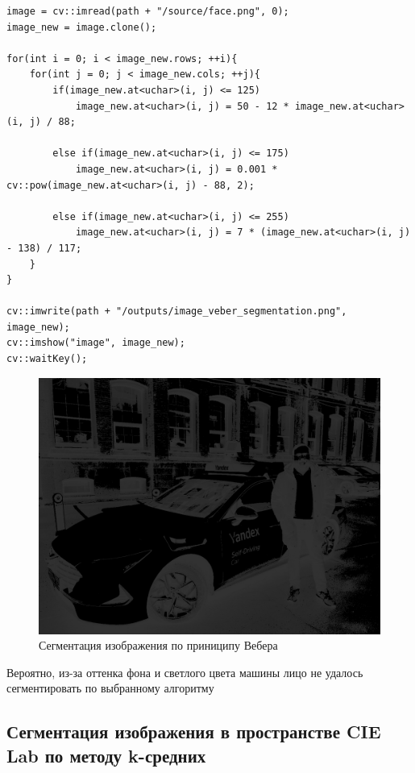 \begin{lstlisting}[style=cpp_white, caption={Исходный код для сегментации по принципу Вебера}]
image = cv::imread(path + "/source/face.png", 0);
image_new = image.clone();

for(int i = 0; i < image_new.rows; ++i){
    for(int j = 0; j < image_new.cols; ++j){
        if(image_new.at<uchar>(i, j) <= 125)
            image_new.at<uchar>(i, j) = 50 - 12 * image_new.at<uchar>(i, j) / 88;   
        
        else if(image_new.at<uchar>(i, j) <= 175)
            image_new.at<uchar>(i, j) = 0.001 * cv::pow(image_new.at<uchar>(i, j) - 88, 2); 
        
        else if(image_new.at<uchar>(i, j) <= 255)
            image_new.at<uchar>(i, j) = 7 * (image_new.at<uchar>(i, j) - 138) / 117; 
    }
}

cv::imwrite(path + "/outputs/image_veber_segmentation.png", image_new);
cv::imshow("image", image_new);
cv::waitKey();
\end{lstlisting}

\begin{figure}[ht]
    \includegraphics[width=\textwidth]{../outputs/image_veber_segmentation.png}
    \caption{Сегментация изображения по приниципу Вебера}
    \label{fig:р}
\end{figure}

Вероятно, из-за оттенка фона и светлого цвета машины лицо не удалось сегментировать по выбранному алгоритму

\subsection{Сегментация изображения в пространстве CIE Lab по методу k-средних}

